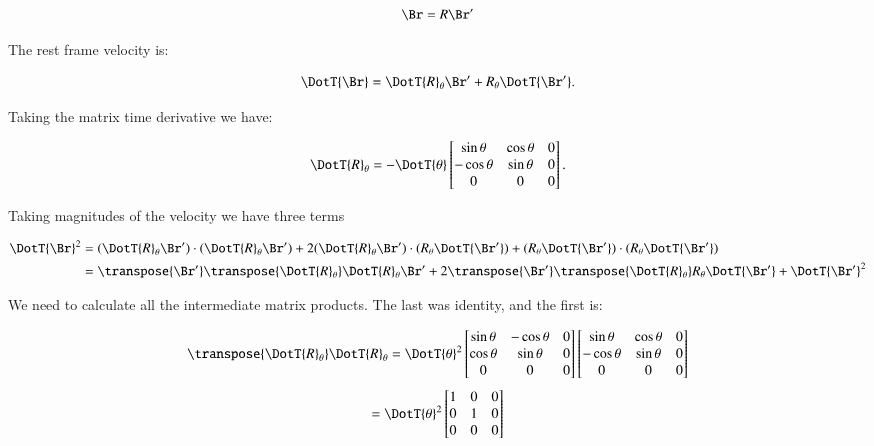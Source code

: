 \[
\Br = R\Br'
\]

%

The rest frame velocity is:

\[
\DotT{\Br} = \DotT{R}_{\theta} \Br' + R_{\theta} \DotT{\Br'}.
\]

Taking the matrix time derivative we have:

\[
\DotT{R}_{\theta} =
-\DotT{\theta}
\begin{bmatrix}
\sin \theta & \cos \theta & 0 \\
-\cos \theta & \sin \theta & 0 \\
0 & 0 & 0 \\
\end{bmatrix}.
\]

Taking magnitudes of the velocity we have three terms

\begin{align*}
\DotT{\Br}^2 
&= 
(\DotT{R}_{\theta} \Br') \cdot (\DotT{R}_{\theta} \Br')
+2 (\DotT{R}_{\theta} \Br') \cdot (R_{\theta} \DotT{\Br'})
+(R_{\theta} \DotT{\Br'}) \cdot (R_{\theta} \DotT{\Br'}) \\
&= 
\transpose{\Br'}\transpose{\DotT{R}_{\theta}} \DotT{R}_{\theta} \Br'
+2 \transpose{\Br'} \transpose{\DotT{R}_{\theta}} R_{\theta} \DotT{\Br'}
+\DotT{\Br'}^2 \\
\end{align*}

We need to calculate all the intermediate matrix products.  The last was 
identity, and the first is:

\[
\transpose{\DotT{R}_{\theta}} \DotT{R}_{\theta}
=
{\DotT{\theta}}^2
\begin{bmatrix}
\sin \theta & -\cos \theta & 0 \\
\cos \theta & \sin \theta & 0 \\
0 & 0 & 0 \\
\end{bmatrix}
\begin{bmatrix}
\sin \theta & \cos \theta & 0 \\
-\cos \theta & \sin \theta & 0 \\
0 & 0 & 0 \\
\end{bmatrix}
\]
\[
=
{\DotT{\theta}}^2
\begin{bmatrix}
1 & 0 & 0 \\
0 & 1 & 0 \\
0 & 0 & 0 \\
\end{bmatrix}
\]


